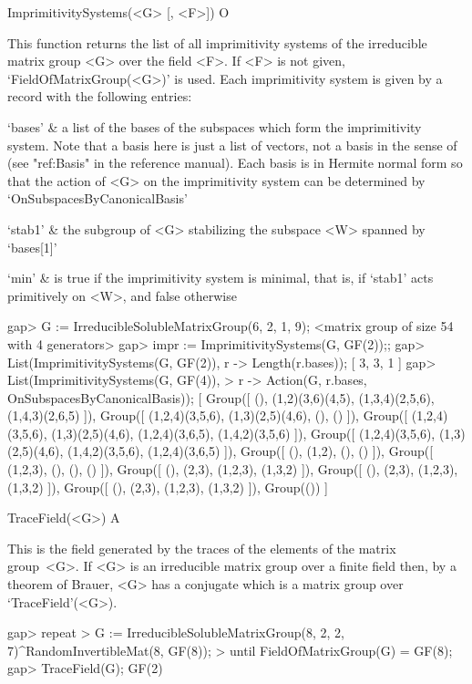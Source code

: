 \>ImprimitivitySystems(<G> [, <F>]) O

This function returns the list of all imprimitivity systems of the 
irreducible matrix group <G> over the field <F>. If <F> is not given, 
`FieldOfMatrixGroup(<G>)' is used. 
Each imprimitivity system is given by a record with the following entries:

\beginitems
`bases' & a list of the bases of the subspaces which form the imprimitivity system. 
          Note that a basis here is just a list of vectors, not a basis in the sense of
          {\GAP} (see "ref:Basis" in the {\GAP} reference manual). Each basis is
          in Hermite normal form so that the action of <G> on the imprimitivity
          system can be determined by `OnSubspacesByCanonicalBasis'
          
`stab1' & the subgroup of <G> stabilizing the subspace <W> spanned by `bases[1]'

`min'   & is true if the imprimitivity system is minimal, that is, if `stab1' 
          acts primitively on <W>, and false otherwise 
\enditems

\beginexample
gap> G := IrreducibleSolubleMatrixGroup(6, 2, 1, 9);
<matrix group of size 54 with 4 generators>
gap> impr := ImprimitivitySystems(G, GF(2));;
gap> List(ImprimitivitySystems(G, GF(2)), r -> Length(r.bases));
[ 3, 3, 1 ]
gap> List(ImprimitivitySystems(G, GF(4)), 
>        r -> Action(G, r.bases, OnSubspacesByCanonicalBasis));
[ Group([ (), (1,2)(3,6)(4,5), (1,3,4)(2,5,6), (1,4,3)(2,6,5) ]), 
  Group([ (1,2,4)(3,5,6), (1,3)(2,5)(4,6), (), () ]), 
  Group([ (1,2,4)(3,5,6), (1,3)(2,5)(4,6), (1,2,4)(3,6,5), (1,4,2)(3,5,6) ]), 
  Group([ (1,2,4)(3,5,6), (1,3)(2,5)(4,6), (1,4,2)(3,5,6), (1,2,4)(3,6,5) ]), 
  Group([ (), (1,2), (), () ]), Group([ (1,2,3), (), (), () ]), 
  Group([ (), (2,3), (1,2,3), (1,3,2) ]), 
  Group([ (), (2,3), (1,2,3), (1,3,2) ]), 
  Group([ (), (2,3), (1,2,3), (1,3,2) ]), Group(()) ]
\endexample



\>TraceField(<G>) A

This is the field generated by the traces of the elements of the matrix group~<G>. 
If <G> is an irreducible matrix group over a finite field then, by a theorem of Brauer, <G>
has a conjugate which is a matrix group over `TraceField'(<G>).

\beginexample
gap> repeat
>        G := IrreducibleSolubleMatrixGroup(8, 2, 2, 7)^RandomInvertibleMat(8, GF(8));
>    until FieldOfMatrixGroup(G) = GF(8);
gap> TraceField(G);
GF(2)
\endexample

